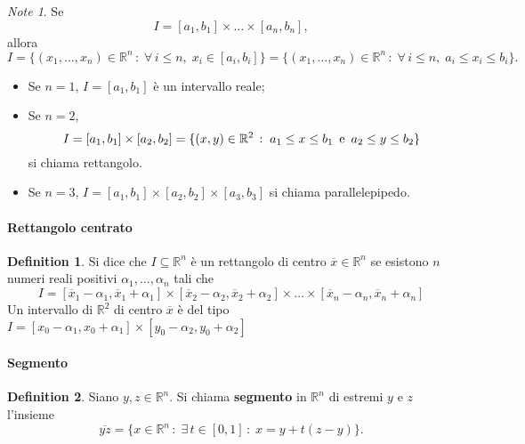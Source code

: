 \documentclass{article}
\theoremstyle{plain}
\theoremstyle{definition}
\newtheorem{defn}{Definition}[section]
\theoremstyle{remark}
\newtheorem{note}{Note}
\begin{document}
\vspace{10pt}

\begin{note}
    Se 
    \[I=[a_1,b_1]\times\ldots\times[a_n,b_n],\] 
    allora 
    \[I=\{(x_1,\ldots,x_n)\in\mathbb{R}^n\,:\;\forall\, i\leq n,\; x_i\in[a_i,b_i]\}=\{(x_1,\ldots,x_n)\in\mathbb{R}^n\,:\;\forall\, i\leq n,\; a_i\leq x_i\leq b_i\}.\]    
\begin{itemize}
    \item Se $n=1$, $I=[a_1,b_1]$ è un intervallo reale;
    \item Se $n=2$, 
    \[I=[a_1,b_1]\times[a_2,b_2]=\{(x,y)\in\mathbb{R}^2\,:\;a_1\leq x\leq b_1\,\textup{ e }\,a_2\leq y\leq b_2\}\]
    si chiama rettangolo.
    \item Se $n=3$, \(I=[a_1,b_1]\times[a_2,b_2]\times[a_3,b_3]\) si chiama parallelepipedo.
\end{itemize}
\end{note}

\vspace{10pt}

\paragraph{Rettangolo centrato}
\begin{bxthm}
\begin{defn}
    Si dice che $I\subseteq\mathbb{R}^n$ è un rettangolo di centro $\overline{x}\in\mathbb{R}^n$ se esistono $n$ numeri reali positivi $\alpha_1,\ldots,\alpha_n$ tali che
    \[I=[\overline{x}_1-\alpha_1,\overline{x}_1+\alpha_1]\times [\overline{x}_2-\alpha_2,\overline{x}_2+\alpha_2]\times\ldots\times [\overline{x}_n-\alpha_n,\overline{x}_n+\alpha_n]\]
    Un intervallo di $\mathbb{R}^2$ di centro $\overline{x}$ è del tipo $I=[x_0-\alpha_1,x_0+\alpha_1]\times[y_0-\alpha_2,y_0+\alpha_2]$
\end{defn}
\end{bxthm}

\vspace{10pt}

\paragraph{Segmento}
\begin{bxthm}
\begin{defn}
    Siano $y,z\in\mathbb{R}^n$. Si chiama \textbf{segmento} in $\mathbb{R}^n$ di estremi $y$ e $z$ l'insieme 
    \[\overline{yz}=\{x\in\mathbb{R}^n\,:\;\exists\, t\in[0,1]\, :\; x=y+t(z-y)\}.\]
\end{defn}
\end{bxthm}
\end{document}
